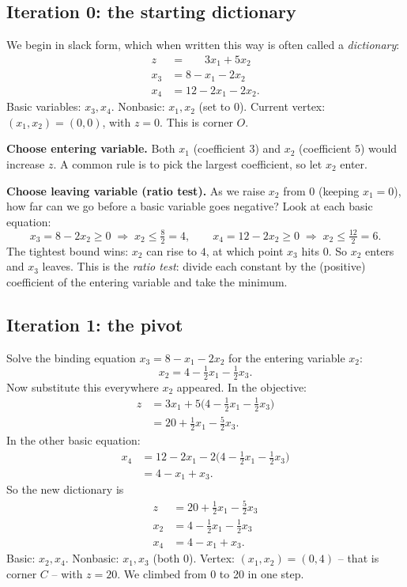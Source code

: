 \subsection{Iteration 0: the starting dictionary}

We begin in slack form, which when written this way is often called a
\emph{dictionary}:
\[
\begin{aligned}
z   &= \phantom{8-{}}3x_1 + 5x_2 \\
x_3 &= 8 - x_1 - 2x_2 \\
x_4 &= 12 - 2x_1 - 2x_2.
\end{aligned}
\]
Basic variables: $x_3, x_4$. Nonbasic: $x_1, x_2$ (set to 0). Current vertex:
$(x_1,x_2)=(0,0)$, with $z = 0$. This is corner $O$.

\textbf{Choose entering variable.} Both $x_1$ (coefficient $3$) and $x_2$
(coefficient $5$) would increase $z$. A common rule is to pick the largest
coefficient, so let $x_2$ enter.

\textbf{Choose leaving variable (ratio test).} As we raise $x_2$ from 0 (keeping
$x_1=0$), how far can we go before a basic variable goes negative? Look at each
basic equation:
\[
x_3 = 8 - 2x_2 \ge 0 \;\Rightarrow\; x_2 \le \tfrac{8}{2}=4,\qquad
x_4 = 12 - 2x_2 \ge 0 \;\Rightarrow\; x_2 \le \tfrac{12}{2}=6.
\]
The tightest bound wins: $x_2$ can rise to $4$, at which point $x_3$ hits $0$.
So $x_2$ enters and $x_3$ leaves. This is the \emph{ratio test}: divide each
constant by the (positive) coefficient of the entering variable and take the
minimum.

\subsection{Iteration 1: the pivot}

Solve the binding equation $x_3 = 8 - x_1 - 2x_2$ for the entering variable
$x_2$:
\[
x_2 = 4 - \tfrac12 x_1 - \tfrac12 x_3 .
\]
Now substitute this everywhere $x_2$ appeared. In the objective:
\begin{align*}
z &= 3x_1 + 5\bigl(4 - \tfrac12 x_1 - \tfrac12 x_3\bigr) \\
  &= 20 + \tfrac12 x_1 - \tfrac52 x_3 .
\end{align*}
In the other basic equation:
\begin{align*}
x_4 &= 12 - 2x_1 - 2\bigl(4 - \tfrac12 x_1 - \tfrac12 x_3\bigr) \\
    &= 4 - x_1 + x_3 .
\end{align*}
So the new dictionary is
\[
\begin{aligned}
z   &= 20 + \tfrac12 x_1 - \tfrac52 x_3 \\
x_2 &= 4 - \tfrac12 x_1 - \tfrac12 x_3 \\
x_4 &= 4 - x_1 + x_3 .
\end{aligned}
\]
Basic: $x_2, x_4$. Nonbasic: $x_1, x_3$ (both 0). Vertex:
$(x_1,x_2)=(0,4)$ -- that is corner $C$ -- with $z = 20$. We climbed from 0 to
20 in one step.

